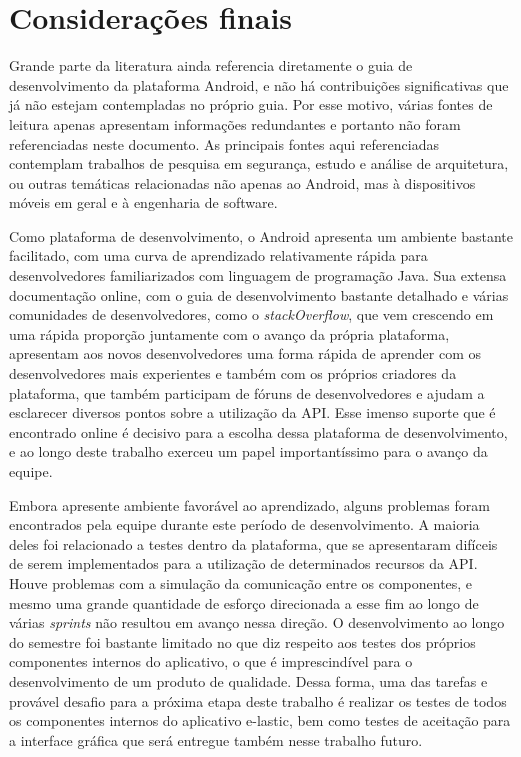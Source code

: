 \chapter{Considerações finais}
\label{consideracoes-finais}


Grande parte da literatura ainda referencia diretamente o guia de desenvolvimento da plataforma Android, e não há contribuições significativas que já não estejam contempladas no próprio guia. Por esse motivo, várias fontes de leitura apenas apresentam informações redundantes e portanto não foram referenciadas neste documento. As principais fontes aqui referenciadas contemplam trabalhos de pesquisa em segurança, estudo e análise de arquitetura, ou outras temáticas relacionadas não apenas ao Android, mas à dispositivos móveis em geral e à engenharia de software.

Como plataforma de desenvolvimento, o Android apresenta um ambiente bastante facilitado, com uma curva de aprendizado relativamente rápida para desenvolvedores familiarizados com linguagem de programação Java. Sua extensa documentação online, com o guia de desenvolvimento bastante detalhado e várias comunidades de desenvolvedores, como o \textit{stackOverflow}, que vem crescendo em uma rápida proporção juntamente com o avanço da própria plataforma, apresentam aos novos desenvolvedores uma forma rápida de aprender com os desenvolvedores mais experientes e também com os próprios criadores da plataforma, que também participam de fóruns de desenvolvedores e ajudam a esclarecer diversos pontos sobre a utilização da API. Esse imenso suporte que é encontrado online é decisivo para a escolha dessa plataforma de desenvolvimento, e ao longo deste trabalho exerceu um papel importantíssimo para o avanço da equipe.

Embora apresente ambiente favorável ao aprendizado, alguns problemas foram encontrados pela equipe durante este período de desenvolvimento. A maioria deles foi relacionado a testes dentro da plataforma, que se apresentaram difíceis de serem implementados para a utilização de determinados recursos da API. Houve problemas com a simulação da comunicação entre os componentes, e mesmo uma grande quantidade de esforço direcionada a esse fim ao longo de várias \textit{sprints} não resultou em avanço nessa direção. O desenvolvimento ao longo do semestre foi bastante limitado no que diz respeito aos testes dos próprios componentes internos do aplicativo, o que é imprescindível para o desenvolvimento de um produto de qualidade. Dessa forma, uma das tarefas e provável desafio para a próxima etapa deste trabalho é realizar os testes de todos os componentes internos do aplicativo e-lastic, bem como testes de aceitação para a interface gráfica que será entregue também nesse trabalho futuro. 

